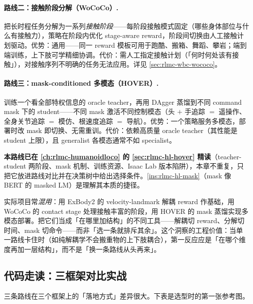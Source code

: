 \paragraph{路线二：接触阶段分解（WoCoCo）.}
把长时程任务分解为一系列\emph{接触阶段}——每阶段接触模式固定（哪些身体部位与什么有接触力），策略在阶段内优化 stage-aware reward，阶段间切换由人工接触计划驱动。优势：通用——同一 reward 模板可用于跑酷、搬箱、舞蹈、攀岩；端到端训练，上下肢可学精细协调。代价：需人工指定接触计划（「何时何处该有接触」），对接触序列不明确的任务无法应用。详见 \cref{sec:rlmc-wbc-wococo}。

\paragraph{路线三：mask-conditioned 多模态（HOVER）.}
训练一个看全部特权信息的 oracle teacher，再用 DAgger 蒸馏到不同 command mask 下的 student——不同 mask 激活不同控制模态（头 $+$ 手追踪 $=$ 遥操作、全身关节追踪 $=$ 模仿、根速度追踪 $=$ 导航）。优势：一个策略服务多模态，部署时改 mask 即切换、无需重训。代价：依赖高质量 oracle teacher（其性能是 student 上限），且 generalist 各模态通常不如 specialist。

\textbf{本路线已在 \cref{ch:rlmc-humanoidloco} 的 \cref{sec:rlmc-hl-hover} 精读}（teacher-student 两阶段、mask 机制、训练资源、Isaac Lab 版本陷阱），本章不重复，只把它放进路线对比并在决策树中给出选择条件。\cref{ins:rlmc-hl-mask}（mask 像 BERT 的 masked LM）是理解其本质的捷径。

\begin{insight}\label{ins:rlmc-wbc-toolbox}
实际项目常\emph{混用}：用 ExBody2 的 velocity-landmark 解耦 reward 作基础，用 WoCoCo 的 contact stage 处理接触丰富的阶段，用 HOVER 的 mask 蒸馏实现多模态部署。把它们当成「在哪里加结构」的不同工具——解耦切 reward、分解切时间、mask 切命令——而非「选一条就排斥其余」。这个洞察的工程价值：当单一路线卡住时（如纯解耦学不会搬重物的上下肢耦合），第一反应应是「在哪个维度再加一层结构」，而不是「换一条路线从头再来」。
\end{insight}

\subsection{代码走读：三框架对比实战}
三条路线在三个框架上的「落地方式」差异很大。下表是选型时的第一张参考图。

